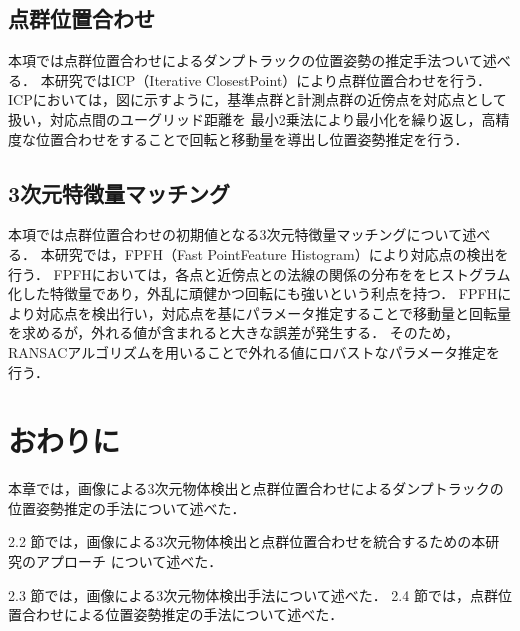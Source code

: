 \subsection{点群位置合わせ}
本項では点群位置合わせによるダンプトラックの位置姿勢の推定手法ついて述べる．
本研究ではICP（Iterative ClosestPoint）\cite{Chetverikov2002}により点群位置合わせを行う．
ICPにおいては，図に示すように，基準点群と計測点群の近傍点を対応点として扱い，対応点間のユーグリッド距離を
最小2乗法により最小化を繰り返し，高精度な位置合わせをすることで回転と移動量を導出し位置姿勢推定を行う．


\newpage

\subsection{3次元特徴量マッチング}
本項では点群位置合わせの初期値となる3次元特徴量マッチングについて述べる．
本研究では，FPFH（Fast PointFeature Histogram）\cite{Rusu2009}により対応点の検出を行う．
FPFHにおいては，各点と近傍点との法線の関係の分布ををヒストグラム化した特徴量であり，外乱に頑健かつ回転にも強いという利点を持つ．
FPFHにより対応点を検出行い，対応点を基にパラメータ推定することで移動量と回転量を求めるが，外れる値が含まれると大きな誤差が発生する．
そのため，RANSACアルゴリズムを用いることで外れる値にロバストなパラメータ推定を行う．

\newpage

\section{おわりに}
本章では，画像による3次元物体検出と点群位置合わせによるダンプトラックの位置姿勢推定の手法について述べた．
\par
2.2 節では，画像による3次元物体検出と点群位置合わせを統合するための本研究のアプローチ
について述べた．
\par
2.3 節では，画像による3次元物体検出手法について述べた．
2.4 節では，点群位置合わせによる位置姿勢推定の手法について述べた．

\newpage